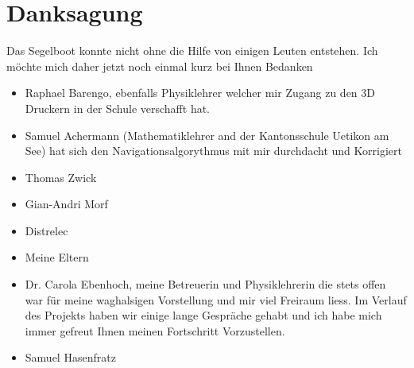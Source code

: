 

\chapter{Danksagung}
\label{chap:danksagung}
Das Segelboot konnte nicht ohne die Hilfe von einigen Leuten entstehen. Ich möchte mich daher jetzt noch einmal kurz bei Ihnen Bedanken
\begin{itemize}

  \item Raphael Barengo, ebenfalls Physiklehrer welcher mir Zugang zu den 3D Druckern in der Schule verschafft hat.
  \item Samuel Achermann (Mathematiklehrer and der Kantonsschule Uetikon am See) hat sich den Navigationsalgorythmus mit mir durchdacht und Korrigiert
  \item Thomas Zwick
  \item Gian-Andri Morf
  \item Distrelec
  \item Meine Eltern
    \item Dr. Carola Ebenhoch, meine Betreuerin und Physiklehrerin die stets offen war für meine waghalsigen Vorstellung und mir viel Freiraum liess. Im Verlauf des Projekts haben wir einige lange Gespräche gehabt und ich habe mich immer gefreut Ihnen meinen Fortschritt Vorzustellen.
    \item Samuel Hasenfratz

 
\end{itemize}
